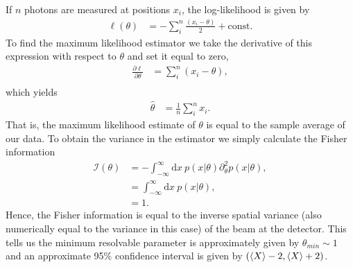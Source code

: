 If $n$ photons are measured at positions $x_i$, the log-likelihood is given by
\begin{align}
  \ell(\theta) &= -\sum_i^n \frac{(x_i - \theta)}{2} + \text{const}.
\end{align}
To find the maximum likelihood estimator we take the derivative of this expression with respect to $\theta$ and set it equal to zero,
\begin{align}
\nonumber  \frac{\partial \ell}{\partial \theta} &= \sum_i^n (x_i - \theta), \\
\end{align}
which yields
\begin{align}
  \hat{\theta} &= \frac{1}{n}\sum_i^n x_i.
\end{align}
That is, the maximum likelihood estimate of $\theta$ is equal to the sample average of our data.  To obtain the variance in the estimator we simply calculate the Fisher information
\begin{align}
\nonumber  \mathcal{I}(\theta) &= -\int_{-\infty}^{\infty}\text{d}x~ p(x|\theta) \partial_\theta^2  p(x|\theta), \\
\nonumber                      &= \int_{-\infty}^{\infty}\text{d}x~ p(x|\theta), \\
                               &= 1.
\end{align}
Hence, the Fisher information is equal to the inverse spatial variance (also numerically equal to the variance in this case) of the beam at the detector.  This tells us the minimum resolvable parameter is approximately given by $\theta_{min} \sim 1$ and an approximate 95\% confidence interval is given by $(\left\langle X \right\rangle - 2, \left\langle X \right\rangle + 2)$.



